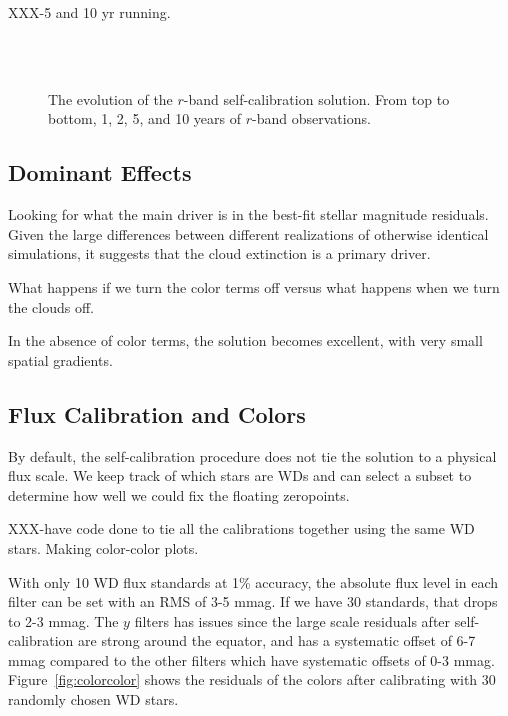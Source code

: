 \documentclass[12pt,preprint]{aastex}
\begin{document}
XXX-5 and 10 yr running.



\begin{figure}
 \\
 \\
\caption{The evolution of the $r$-band self-calibration solution.  From top to bottom, 1, 2, 5, and 10 years of $r$-band observations.  \label{fig:timeevo}}
\end{figure}


\subsection{Dominant Effects}

Looking for what the main driver is in the best-fit stellar magnitude residuals.  Given the large differences between different realizations of otherwise identical simulations, it suggests that the cloud extinction is a primary driver.  

What happens if we turn the color terms off versus what happens when we turn the clouds off.  

In the absence of color terms, the solution becomes excellent, with very small spatial gradients.  

\subsection{Flux Calibration and Colors}\label{sec:fluxcal}

By default, the self-calibration procedure does not tie the solution to a physical flux scale.  We keep track of which stars are WDs and can select a subset to determine how well we could fix the floating zeropoints.  

XXX-have code done to tie all the calibrations together using the same WD stars.  Making color-color plots.


With only 10 WD flux standards at 1\% accuracy, the absolute flux level in each filter can be set with an RMS of 3-5 mmag.  If we have 30 standards, that drops to 2-3 mmag.  The $y$ filters has issues since the large scale residuals after self-calibration are strong around the equator, and has a systematic offset of 6-7 mmag compared to the other filters which have systematic offsets of 0-3 mmag.  Figure~\ref{fig:colorcolor} shows the residuals of the colors after calibrating with 30 randomly chosen WD stars.
\end{document}
